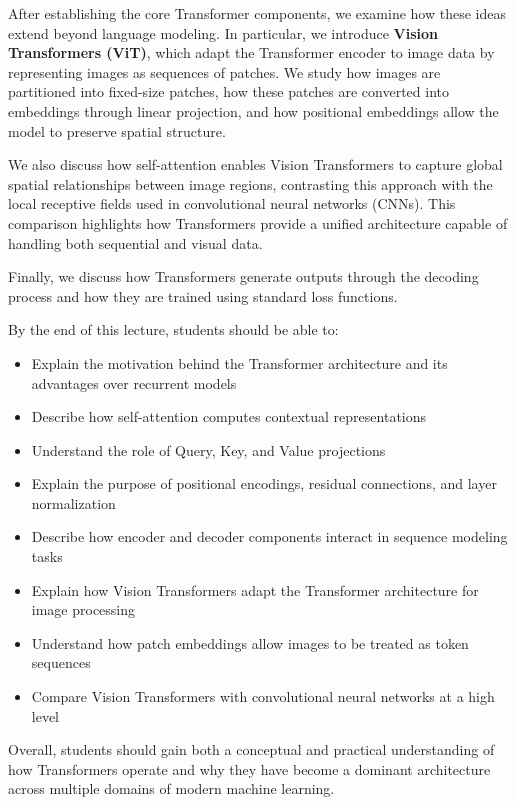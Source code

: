 \documentclass[11pt]{article}
\begin{document}
After establishing the core Transformer components, we examine how these ideas extend beyond language modeling. In particular, we introduce \textbf{Vision Transformers (ViT)}, which adapt the Transformer encoder to image data by representing images as sequences of patches. We study how images are partitioned into fixed-size patches, how these patches are converted into embeddings through linear projection, and how positional embeddings allow the model to preserve spatial structure.

We also discuss how self-attention enables Vision Transformers to capture global spatial relationships between image regions, contrasting this approach with the local receptive fields used in convolutional neural networks (CNNs). This comparison highlights how Transformers provide a unified architecture capable of handling both sequential and visual data.

Finally, we discuss how Transformers generate outputs through the decoding process and how they are trained using standard loss functions.

By the end of this lecture, students should be able to:

\begin{itemize}
\item Explain the motivation behind the Transformer architecture and its advantages over recurrent models
\item Describe how self-attention computes contextual representations
\item Understand the role of Query, Key, and Value projections
\item Explain the purpose of positional encodings, residual connections, and layer normalization
\item Describe how encoder and decoder components interact in sequence modeling tasks
\item Explain how Vision Transformers adapt the Transformer architecture for image processing
\item Understand how patch embeddings allow images to be treated as token sequences
\item Compare Vision Transformers with convolutional neural networks at a high level
\end{itemize}

Overall, students should gain both a conceptual and practical understanding of how Transformers operate and why they have become a dominant architecture across multiple domains of modern machine learning.
\end{document}
